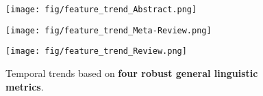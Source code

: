 



\begin{figure}[t]
    \centering
    \begin{minipage}{0.98\linewidth}
        \centering
        \texttt{[image: fig/feature\_trend\_Abstract.png]}
        \captionsetup{font=footnotesize}
    \end{minipage}
    \hfill
    \begin{minipage}{0.98\linewidth}
        \centering
        \texttt{[image: fig/feature\_trend\_Meta-Review.png]}
        \captionsetup{font=footnotesize}
    \end{minipage}
    \hfill
    \begin{minipage}{0.98\linewidth}
        \centering
        \texttt{[image: fig/feature\_trend\_Review.png]}
        \captionsetup{font=footnotesize}
    \end{minipage}
    \hfill

    \caption{Temporal trends based on \textbf{four robust general linguistic metrics}.
    }
    \label{fig:trend_general}
\end{figure}


